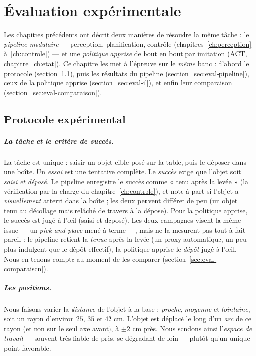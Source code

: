 \chapter{Évaluation expérimentale}
\label{ch:evaluation}

Les chapitres précédents ont décrit deux manières de résoudre la même tâche : le \emph{pipeline modulaire} --- perception, planification, contrôle (chapitres~\ref{ch:perception} à~\ref{ch:controle}) --- et une \emph{politique apprise} de bout en bout par imitation (ACT, chapitre~\ref{ch:etat}). Ce chapitre les met à l'épreuve sur le \emph{même} banc : d'abord le protocole (section~\ref{sec:eval-protocole}), puis les résultats du pipeline (section~\ref{sec:eval-pipeline}), ceux de la politique apprise (section~\ref{sec:eval-il}), et enfin leur comparaison (section~\ref{sec:eval-comparaison}).

\section{Protocole expérimental}
\label{sec:eval-protocole}

\paragraph{La tâche et le critère de succès.} La tâche est unique : saisir un objet cible posé sur la table, puis le déposer dans une boîte. Un \emph{essai} est une tentative complète. Le \emph{succès} exige que l'objet soit \emph{saisi} \emph{et} \emph{déposé}. Le pipeline enregistre le succès comme « tenu après la levée » (la vérification par la charge du chapitre~\ref{ch:controle}), et note à part si l'objet a \emph{visuellement} atterri dans la boîte ; les deux peuvent différer de peu (un objet tenu au décollage mais relâché de travers à la dépose). Pour la politique apprise, le succès est jugé à l'œil (saisi et déposé). Les deux campagnes visent la même issue --- un \emph{pick-and-place} mené à terme ---, mais ne la mesurent pas tout à fait pareil : le pipeline retient la \emph{tenue} après la levée (un proxy automatique, un peu plus indulgent que le dépôt effectif), la politique apprise le \emph{dépôt} jugé à l'œil. Nous en tenons compte au moment de les comparer (section~\ref{sec:eval-comparaison}).

\paragraph{Les positions.} Nous faisons varier la \emph{distance} de l'objet à la base : \emph{proche}, \emph{moyenne} et \emph{lointaine}, soit un rayon d'environ $25$, $35$ et $42$ cm. L'objet est déplacé le long d'un \emph{arc} de ce rayon (et non sur le seul axe avant), à $\pm 2$ cm près. Nous sondons ainsi l'\emph{espace de travail} --- souvent très fiable de près, se dégradant de loin --- plutôt qu'un unique point favorable.

